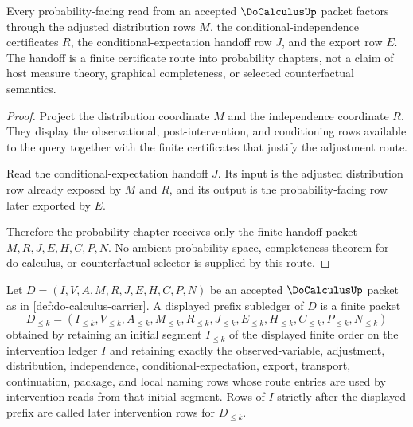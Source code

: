 \begin{theorem}
\label{thm:do-calculus-probability-handoff}
Every probability-facing read from an accepted $\DoCalculusUp$ packet factors
through the adjusted distribution rows $M$, the conditional-independence
certificates $R$, the conditional-expectation handoff row $J$, and the export
row $E$. The handoff is a finite certificate route into probability chapters,
not a claim of host measure theory, graphical completeness, or selected
counterfactual semantics.
\end{theorem}
\begin{proof}
Project the distribution coordinate $M$ and the independence coordinate $R$.
They display the observational, post-intervention, and conditioning rows
available to the query together with the finite certificates that justify the
adjustment route.

Read the conditional-expectation handoff $J$. Its input is the adjusted
distribution row already exposed by $M$ and $R$, and its output is the
probability-facing row later exported by $E$.

Therefore the probability chapter receives only the finite handoff packet
$M,R,J,E,H,C,P,N$. No ambient probability space, completeness theorem for
do-calculus, or counterfactual selector is supplied by this route.
\end{proof}

\begin{definition}
\label{def:do-calculus-displayed-prefix-subledger}
Let $D=(I,V,A,M,R,J,E,H,C,P,N)$ be an accepted $\DoCalculusUp$ packet as in \autoref{def:do-calculus-carrier}. A displayed prefix subledger of $D$ is a finite packet
$$
D_{\leq k}=(I_{\leq k},V_{\leq k},A_{\leq k},M_{\leq k},R_{\leq k},J_{\leq k},E_{\leq k},H_{\leq k},C_{\leq k},P_{\leq k},N_{\leq k})
$$
obtained by retaining an initial segment $I_{\leq k}$ of the displayed finite order on the intervention ledger $I$ and retaining exactly the observed-variable, adjustment, distribution, independence, conditional-expectation, export, transport, continuation, package, and local naming rows whose route entries are used by intervention reads from that initial segment. Rows of $I$ strictly after the displayed prefix are called later intervention rows for $D_{\leq k}$.
\end{definition}

